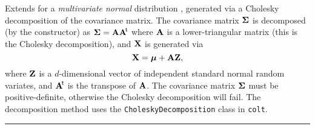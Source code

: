 
Extends  for a \emph{multivariate normal} distribution
\cite{tJOH72a}, generated via a Cholesky decomposition of the covariance
matrix. The covariance matrix $\boldsymbol{\Sigma}$ is decomposed (by the constructor)
as $\boldsymbol{\Sigma} = \textbf{A}\textbf{A}^{\!\mathsf{t}}$ where $\textbf{A}$ is a lower-triangular matrix
(this is the Cholesky decomposition), and $\textbf{X}$ is generated via
\[
  \textbf{X} = \boldsymbol{\mu} + \textbf{A} \textbf{Z},
\]
where $\textbf{Z}$ is a $d$-dimensional vector of independent standard normal random
variates, and  $\textbf{A}^{\!\mathsf{t}}$ is the transpose of $\textbf{A}$.
The covariance matrix $\boldsymbol{\Sigma}$ must be positive-definite, otherwise the
Cholesky decomposition will fail. The decomposition method
uses the \texttt{CholeskyDecom\-po\-sition} class in \texttt{colt}.


\bigskip\hrule

